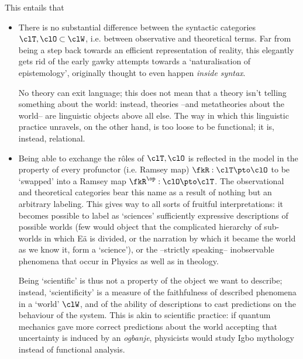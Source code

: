 This entails that
\begin{itemize}
	\item There is no substantial difference between the syntactic categories $\clT,\clO\subset \clW$, i.e. between observative and theoretical terms. Far from being a step back towards an efficient representation of reality, this elegantly gets rid of the early gawky attempts towards a `naturalisation of epistemology', originally thought to even happen \emph{inside syntax}.

	      No theory can exit language; this does not mean that a theory isn't telling something about the world: instead, theories --and metatheories about the world-- are linguistic objects above all else. The way in which this linguistic practice unravels, on the other hand, is too loose to be functional; it is, instead, relational.
	\item Being able to exchange the r\^oles of $\clT,\clO$ is reflected in the model in the property of every profunctor (i.e. Ramsey map) $\fkR : \clT \pto \clO$ to be `swapped' into a Ramsey map $\fkR^\op : \clO \pto \clT$. The observational and theoretical categories bear this name as a result of nothing but an arbitrary labeling. This gives way to all sorts of fruitful interpretations: it becomes possible to label as `sciences' sufficiently expressive descriptions of possible worlds (few would object that the complicated hierarchy of sub-worlds in which Eä is divided, or the narration by which it became the world as we know it, form a `science'), or the --strictly speaking-- inobservable phenomena that occur in Physics as well as in theology.

	      Being `scientific' is thus not a property of the object we want to describe; instead, `scientificity' is a measure of the faithfulness of described phenomena in a `world' $\clW$, and of the ability of descriptions to cast predictions on the behaviour of the system. This is akin to scientific practice: if quantum mechanics gave more correct predictions about the world accepting that uncertainty is induced by an \emph{ogbanje}, physicists would study Igbo mythology instead of functional analysis.

\end{itemize}


